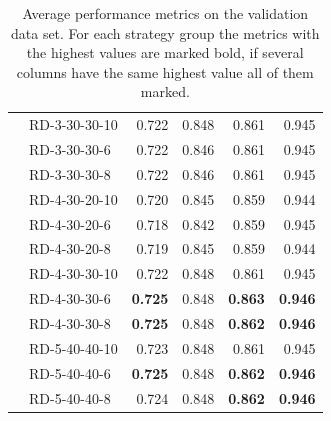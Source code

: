 \begin{table}[ht]
\begin{tabular}{llrrrr}
		                            & RD-3-30-30-10  & 0.722          & 0.848          & 0.861          & 0.945          \\
		                            & RD-3-30-30-6   & 0.722          & 0.846          & 0.861          & 0.945          \\
		                            & RD-3-30-30-8   & 0.722          & 0.846          & 0.861          & 0.945          \\
		                            & RD-4-30-20-10  & 0.720          & 0.845          & 0.859          & 0.944          \\
		                            & RD-4-30-20-6   & 0.718          & 0.842          & 0.859          & 0.945          \\
		                            & RD-4-30-20-8   & 0.719          & 0.845          & 0.859          & 0.944          \\
		                            & RD-4-30-30-10  & 0.722          & 0.848          & 0.861          & 0.945          \\
		                            & RD-4-30-30-6   & \textbf{0.725} & 0.848          & \textbf{0.863} & \textbf{0.946} \\
		                            & RD-4-30-30-8   & \textbf{0.725} & 0.848          & \textbf{0.862} & \textbf{0.946} \\
		                            & RD-5-40-40-10  & 0.723          & 0.848          & 0.861          & 0.945          \\
		                            & RD-5-40-40-6   & \textbf{0.725} & 0.848          & \textbf{0.862} & \textbf{0.946} \\
		                            & RD-5-40-40-8   & 0.724          & 0.848          & \textbf{0.862} & \textbf{0.946} \\
		\bottomrule
	\end{tabular}
	\caption[Average performance metrics on the validation data set.]{Average performance metrics on the validation data set.
		For each strategy group the metrics with the highest values are marked bold, if several columns have the same highest value
		all of them marked.}
	\label{tab:featurePerformance_validationDataset}
\end{table}

\clearpage

